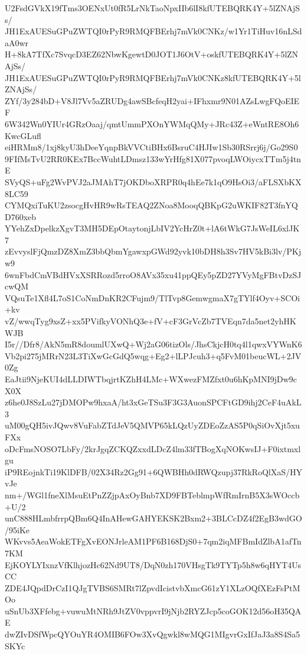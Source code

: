 U2FsdGVkX19fTms3OENxUt0fR5LrNkTaoNpxIIb6lI8kfUTEBQRK4Y+5lZNAjSs/
JH1ExAUESuGPuZWTQI0rPyR9RMQFBErhj7mVk0CNKz/w1Yr1TiHuv16nLSdaA0wr
H+8kA7TfXc7SvqcD3EZ62NbwKgewtD0JOT1J6OtV+oskfUTEBQRK4Y+5lZNAjSs/
JH1ExAUESuGPuZWTQI0rPyR9RMQFBErhj7mVk0CNKz8kfUTEBQRK4Y+5lZNAjSs/
ZYf/3y284bD+V8Jl7Vv5aZRUDg4awSBcfeqH2yai+IFhxmr9N01AZsLwgFQoEIEF
6W342Wn0YIUr4GRzOaaj/qmtUmmPXOnYWMqQMy+JRc43Z+eWntRE8Oh6KwcGLufl
eiHRMm8/1xj8kyU3hDeeYqnpBkVVCtiBHx6BsruC4HJIw1Sb30RSrrj6j/Go29S0
9FIfMsTvU2RR0KEx7BccWuhtLDmsz133wYrHfg81X077pvoqLWOiycxTTm5j4tnE
SVyQS+uFg2WvPVJ2aJMAhT7jOKDboXRPR0q4hEe7k1qO9HsOi3/aFLSXbKX8LC59
CYMQxiTuKU2zsocgHvHR9wRsTEAQ2ZNoa8MooqQBKpG2uWKIF82T3fnYQD760xeb
YYehZxDpelkzXgvT3MH5DEpOtaytonjLbIV2YcHrZ0t+lA6tWkG7JsWeIL6xlJK7
zEvvyslFjQmzDZ8XmZ3bbQbmYgawxpGWd92yvk10bDH8h3Sv7HV5kBi3lv/PKjw9
6wnFbdCmVBdHVxXSRRozd5rroO8AVx35xu41ppQEy5pZD27YVyMgFBtvDzSJcwQM
VQsuTe1Xfl4L7oS1CoNmDnKR2CFujm9/TlTvp8GemwgmaX7gTYlf4Oyv+SCOi+kv
vZ/wwqTyg9xsZ+xx5PVifkyVONhQ3e+fV+cF3GrVcZb7TVEqn7da5net2yhHKWJB
I5r//Dfr8/AkN5mR8doumlUXwQ+Wj2aG06tizOls/JhsCkjcH0tq4l1qwxVYWnK6
Vb2pi275jMRrN23L3TiXwGcGdQ5wqg+Eg2+lLPJcuh3+q5FvM01beucWL+2JV0Zg
EaJtii9NjeKUI4dLLDIWTbqjrtKZhH4LMc+WXwezFMZfxt0u6hKpMNI9jDw9cX0X
z6he0J8SzLu27jDMOPw9hxaA/ht3xGeTSu3F3G3AuonSPCFtGD9ihj2CeF4uAkL3
uM00gQH5ivJQwv8VuFabZTdJeV5QMVP65kLQzUyZDEoZzAS5P0qSiOvXjt5xuFXx
oDcFmsNOSO7LbFy/2krJgqZCKQZxxdLDcZ4lm33fTBogXqNOKwsIJ+F0ixtmxlgu
iP9REojnkTi19KlDFB/02X34Rz2Gg91+6QWBHh0dRWQzupj37RkRoQlXaS/HYvJe
nm+/WGl1fneXlMsuEtPnZZjpAxOyBnb7XD9FBTeblmpWfRmIrnB5X3sWOccb+U/2
unC888HLmbfrrpQBm6Q4InAHewGAHYEKSK2Bxm2+3BLCcDZ4f2EgB3wdGO/95iKe
WKvvs5AeaWokETFgXvEONJrleAM1PF6B168DjS0+7qm2iqMFBmIdZlbA1afTn7KM
EjKOYLYIxnzVfKlhjozHc62Nd9UT8/DqN0zh170VHsgTk9TYTp5h8w6qHYT4UsCC
ZDE4JQpdDrCzI1QJgTVBS6SMRt7lZpvdIcistvbXmcG61zY1XLzOQfXEzFsPtMOo
uSnUb3XFfebg+vuwuMtNRh9JtZV0vppvrI9jNjb2RYZJcp5coGOK12d56oH35QAE
dwZIvDSfWpcQYOuYR4OMIB6FOw3XvQgwkl8wMQG1MIgvrGxIfJaJ3a8S4Sa5SKYc
